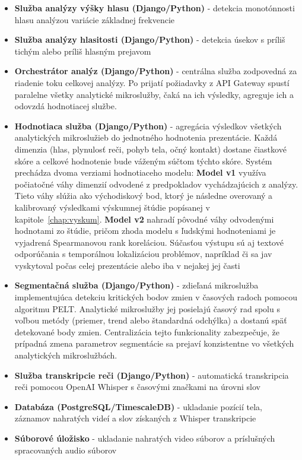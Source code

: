 \begin{itemize}
    \begin{itemize}
        \item Konkrétne miesta, kedy prezentujúci povedal výplňové slovo
        \item Detekciu kritických bodov zmien v používaní výplňových slov
    \end{itemize}
    \item \textbf{Služba analýzy výšky hlasu (Django/Python)} - detekcia monotónnosti hlasu analýzou variácie základnej frekvencie
    \item \textbf{Služba analýzy hlasitosti (Django/Python)} - detekcia úsekov s príliš tichým alebo príliš hlasným prejavom
    \item \textbf{Orchestrátor analýz (Django/Python)} - centrálna služba zodpovedná za riadenie toku celkovej analýzy. Po prijatí požiadavky z API Gateway spustí paralelne všetky analytické mikroslužby, čaká na ich výsledky, agreguje ich a odovzdá hodnotiacej službe.
    \item \textbf{Hodnotiaca služba (Django/Python)} - agregácia výsledkov všetkých analytických mikroslužieb do jednotného hodnotenia prezentácie. Každá dimenzia (hlas, plynulosť reči, pohyb tela, očný kontakt) dostane čiastkové skóre a celkové hodnotenie bude váženým súčtom týchto skóre. Systém prechádza dvoma verziami hodnotiaceho modelu: \textbf{Model v1} využíva počiatočné váhy dimenzií odvodené z predpokladov vychádzajúcich z analýzy. Tieto váhy slúžia ako východiskový bod, ktorý je následne overovaný a kalibrovaný výsledkami výskumnej štúdie popísanej v kapitole~\ref{chap:vyskum}. \textbf{Model v2} nahradí pôvodné váhy odvodenými hodnotami zo štúdie, pričom zhoda modelu s ľudskými hodnoteniami je vyjadrená Spearmanovou rank koreláciou. Súčasťou výstupu sú aj textové odporúčania s temporálnou lokalizáciou problémov, napríklad či sa jav vyskytoval počas celej prezentácie alebo iba v nejakej jej časti
    \item \textbf{Segmentačná služba (Django/Python)} - zdieľaná mikroslužba implementujúca detekciu kritických bodov zmien v časových radoch pomocou algoritmu PELT. Analytické mikroslužby jej posielajú časový rad spolu s voľbou metódy (priemer, trend alebo štandardná odchýlka) a dostanú späť detekované body zmien. Centralizácia tejto funkcionality zabezpečuje, že prípadná zmena parametrov segmentácie sa prejaví konzistentne vo všetkých analytických mikroslužbách.
    \item \textbf{Služba transkripcie reči (Django/Python)} - automatická transkripcia reči pomocou OpenAI Whisper s časovými značkami na úrovni slov
    \item \textbf{Databáza (PostgreSQL/TimescaleDB)} - ukladanie pozícií tela, záznamov nahratých videí a slov získaných z Whisper transkripcie
    \item \textbf{Súborové úložisko} - ukladanie nahratých video súborov a príslušných spracovaných audio súborov
\end{itemize}

